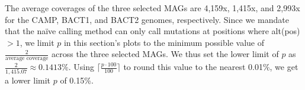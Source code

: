 The average coverages of the three selected MAGs are 4,159x, 1,415x, and 2,993x for the CAMP, BACT1, and BACT2 genomes, respectively. Since we mandate that the na\"ive calling method can only call mutations at positions where alt(pos) $> 1$, we limit $p$ in this section's plots to the minimum possible value of $\frac{2}{\text{average coverage}}$ across the three selected MAGs. We thus set the lower limit of $p$ as $\frac{2}{1,415.07} \approx 0.1413\%$. Using $\big\lceil \frac{p \cdot 100}{100} \big\rceil$ to round this value to the nearest 0.01\%, we get a lower limit $p$ of 0.15\%.\endinput